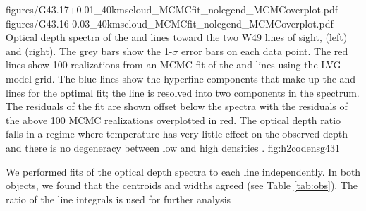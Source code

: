 \FigureTwo
          {figures/G43.17+0.01_40kmscloud_MCMCfit_nolegend_MCMCoverplot.pdf}
          {figures/G43.16-0.03_40kmscloud_MCMCfit_nolegend_MCMCoverplot.pdf}
{Optical depth spectra of the \oneone and \twotwo lines toward the two W49
lines of sight, \north (left) and \south (right).   The grey bars show the
1-$\sigma$ error bars on each data point.  The red lines show 100 realizations
from an MCMC fit of the \ortho \oneone and \twotwo lines using the LVG model
grid.  The blue lines show the hyperfine components that make up the \oneone
and \twotwo lines for the optimal fit; the \oneone line is resolved into two
components in the \north spectrum.  The residuals of the fit are shown offset
below the spectra with the residuals of the above 100 MCMC realizations
overplotted in red.  The optical depth ratio falls in a regime where
temperature has very little effect on the observed depth and there is no
degeneracy between low and high densities \citep{Ginsburg2011a}.  }
{fig:h2codensg43}{1}


We performed fits of the optical depth spectra to each line independently. In
both objects, we found that the centroids and widths agreed (see Table
\ref{tab:obs}).  The ratio of the line integrals is used for further analysis

